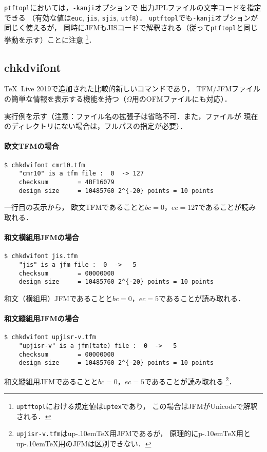 \documentclass[a4paper,11pt,nomag]{jsarticle}
\def\size#1{\mathit{#1}}
\def\code#1{\texttt{#1}}
\def\pTeX{p\kern-.10em\TeX}\def\upTeX{u\pTeX}
\def\OMEGA{$\Omega$}
\begin{document}
\code{ptftopl}においては，\code{-kanji}オプションで
出力JPLファイルの文字コードを指定できる
（有効な値は\code{euc}, \code{jis}, \code{sjis}, \code{utf8}）．
\code{uptftopl}でも\code{-kanji}オプションが同じく使えるが，
同時にJFMもJISコードで解釈される（従って\code{ptftopl}と同じ挙動を示す）ことに注意
\footnote{\code{uptftopl}における規定値は\code{uptex}であり，
この場合はJFMがUnicodeで解釈される．}．

\subsection{chkdvifont}

\TeX\ Live 2019で追加された比較的新しいコマンドであり，
TFM/JFMファイルの簡単な情報を表示する機能を持つ（\OMEGA 用のOFMファイルにも対応）．

実行例を示す（注意：ファイル名の拡張子は省略不可．また，ファイルが
現在のディレクトリにない場合は，フルパスの指定が必要）．

\paragraph{欧文TFMの場合}
\begin{verbatim}
$ chkdvifont cmr10.tfm
    "cmr10" is a tfm file :  0  -> 127
    checksum        = 4BF16079
    design size     = 10485760 2^{-20} points = 10 points
\end{verbatim}
一行目の表示から，
欧文TFMであることと$\size{bc}=0$，$\size{ec}=127$であることが読み取れる．

\paragraph{和文横組用JFMの場合}
\begin{verbatim}
$ chkdvifont jis.tfm
    "jis" is a jfm file :  0  ->   5
    checksum        = 00000000
    design size     = 10485760 2^{-20} points = 10 points
\end{verbatim}
和文（横組用）JFMであることと$\size{bc}=0$，$\size{ec}=5$であることが読み取れる．

\paragraph{和文縦組用JFMの場合}
\begin{verbatim}
$ chkdvifont upjisr-v.tfm
    "upjisr-v" is a jfm(tate) file :  0  ->   5
    checksum        = 00000000
    design size     = 10485760 2^{-20} points = 10 points
\end{verbatim}
和文縦組用JFMであることと$\size{bc}=0$，$\size{ec}=5$であることが読み取れる
\footnote{\code{upjisr-v.tfm}は\upTeX 用JFMであるが，
原理的に\pTeX 用と\upTeX 用のJFMは区別できない．}．
\end{document}
